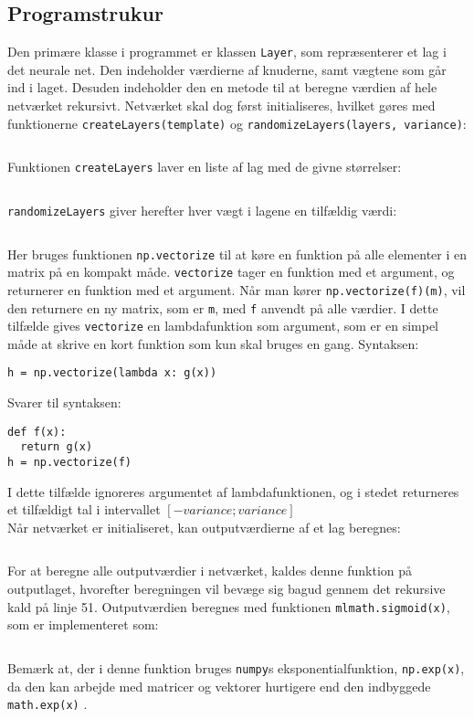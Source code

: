 \documentclass[../SOP.tex]{subfile}
\begin{document}
\subsection{Programstrukur}
Den primære klasse i programmet er klassen \texttt{Layer}, som repræsenterer et lag i det neurale net. Den indeholder værdierne af knuderne, samt vægtene som går ind i laget. Desuden indeholder den en metode til at beregne værdien af hele netværket rekursivt. Netværket skal dog først initialiseres, hvilket gøres med funktionerne \texttt{createLayers(template)} og \texttt{randomizeLayers(layers, variance)}:
\inputminted[firstline=36,lastline=39,gobble=4]{python3}{./Code/main.py}
Funktionen \texttt{createLayers} laver en liste af lag med de givne størrelser:
\inputminted[firstline=155,lastline=163]{python3}{./Code/main.py}
\texttt{randomizeLayers} giver herefter hver vægt i lagene en tilfældig værdi:
\inputminted[firstline=166,lastline=171]{python3}{./Code/main.py}
\noindent Her bruges funktionen \texttt{np.vectorize} til at køre en funktion på alle elementer i en matrix på en kompakt måde. \texttt{vectorize} tager en funktion med et argument, og returnerer en funktion med et argument. Når man kører \texttt{np.vectorize(f)(m)}, vil den returnere en ny matrix, som er \texttt{m}, med \texttt{f} anvendt på alle værdier. I dette tilfælde gives \texttt{vectorize} en lambdafunktion som argument, som er en simpel måde at skrive en kort funktion som kun skal bruges en gang. Syntaksen:
\begin{verbatim}
h = np.vectorize(lambda x: g(x))
\end{verbatim}
Svarer til syntaksen:
\begin{verbatim}
def f(x):
  return g(x)
h = np.vectorize(f)
\end{verbatim}
I dette tilfælde ignoreres argumentet af lambdafunktionen, og i stedet returneres et tilfældigt tal i intervallet $[-variance;variance]$\\
Når netværket er initialiseret, kan outputværdierne af et lag beregnes:
\inputminted[firstline=34,lastline=55,highlightlines=51,gobble=4]{python3}{./Code/layer.py}
For at beregne alle outputværdier i netværket, kaldes denne funktion på outputlaget, hvorefter beregningen vil bevæge sig bagud gennem det rekursive kald på linje 51. Outputværdien beregnes med funktionen \texttt{mlmath.sigmoid(x)}, som er implementeret som:
\inputminted[firstline=4,lastline=5,mathescape]{python3}{./Code/mlmath.py}
Bemærk at, der i denne funktion bruges \texttt{numpy}s eksponentialfunktion, \texttt{np.exp(x)}, da den kan arbejde med matricer og vektorer hurtigere end den indbyggede \texttt{math.exp(x)} \parencite{numpy}.
\end{document}
